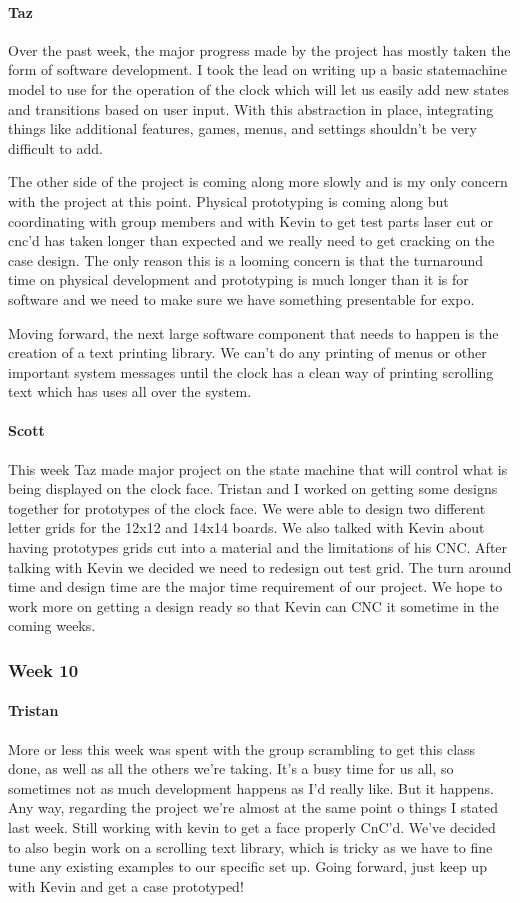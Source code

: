 \documentclass[onecolumn, draftclsnofoot,10pt, compsoc]{IEEEtran}
\begin{document}
\paragraph{Taz}
Over the past week, the major progress made by the project has mostly taken the form of software development. I took the lead on writing up a basic statemachine model to use for the operation of the clock which will let us easily add new states and transitions based on user input. With this abstraction in place, integrating things like additional features, games, menus, and settings shouldn't be very difficult to add.

The other side of the project is coming along more slowly and is my only concern with the project at this point. Physical prototyping is coming along but coordinating with group members and with Kevin to get test parts laser cut or cnc'd has taken longer than expected and we really need to get cracking on the case design. The only reason this is a looming concern is that the turnaround time on physical development and prototyping is much longer than it is for software and we need to make sure we have something presentable for expo.

Moving forward, the next large software component that needs to happen is the creation of a text printing library. We can't do any printing of menus or other important system messages until the clock has a clean way of printing scrolling text which has uses all over the system.
\paragraph{Scott}
This week Taz made major project on the state machine that will control what is being displayed on the clock face. Tristan and I worked on getting some designs together for prototypes of the clock face. We were able to design two different letter grids for the 12x12 and 14x14 boards. We also talked with Kevin about having prototypes grids cut into a material and the limitations of his CNC. After talking with Kevin we decided we need to redesign out test grid. The turn around time and design time are the major time requirement of our project. We hope to work more on getting a design ready so that Kevin can CNC it sometime in the coming weeks.
\subsubsection{Week 10}
\paragraph{Tristan}
More or less this week was spent with the group scrambling to get this class done, as well as all the others we're taking. It's a busy time for us all, so sometimes not as much development happens as I'd really like. But it happens. Any way, regarding the project we're almost at the same point o things I stated last week. Still working with kevin to get a face properly CnC'd. We've decided to also begin work on a scrolling text library, which is tricky as we have to fine tune any existing examples to our specific set up. Going forward, just keep up with Kevin and get a case prototyped!
\end{document}
